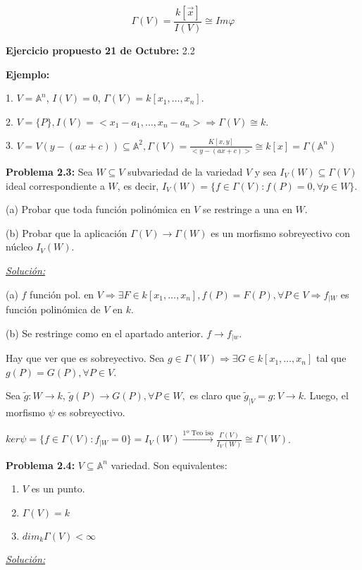 $$\Gamma(V)=\frac{k[\vec{x}]}{I(V)}\cong Im\varphi $$

\textbf{Ejercicio propuesto 21 de Octubre:} 2.2


\textbf{Ejemplo: } 

1. $V=\mathbb{A}^n $, $I(V)=0 $, $\Gamma(V)=k[x_1,\dots,x_n]$.

2. $V=\{P\}, I(V)=<x_1-a_1,\dots,x_n-a_n> \Rightarrow \Gamma (V)\cong k$.

3. $V=V(y-(ax+c))\subseteq \mathbb{A}^2, \Gamma (V)=\frac{K[x,y]}{<y-(ax+c)>}\cong k[x]=\Gamma(\mathbb{A}^n)$

\textbf{Problema 2.3: } Sea $W\subseteq V$ subvariedad de la variedad $V$ y sea $I_V(W)\subseteq \Gamma(V)$ ideal correspondiente a $W$, es decir, $I_V(W)=\{f\in \Gamma(V): f(P)=0, \forall p\in W \}$.

(a) Probar que toda función polinómica en $V$ se restringe a una en $W$.

(b) Probar que la aplicación $\Gamma(V)\rightarrow \Gamma (W)$ es un morfismo sobreyectivo con núcleo $I_V(W)$. 

\underline{\textit{Solución: }}

(a) $f$ función pol. en $V \Rightarrow \exists F\in k[x_1,\dots,x_n], f(P)=F(P), \forall P\in V \Rightarrow f_{|W}$ es función polinómica de $V$ en $k$.

(b) Se restringe como en el apartado anterior. $f\rightarrow f_{|w}$.

Hay que ver que es sobreyectivo. Sea $g\in \Gamma(W)\Rightarrow \exists G\in k[x_1,\dots,x_n]$ tal que $g(P)=G(P), \forall P\in V$.

Sea $\tilde{g}:W\rightarrow k$, $\tilde{g}(P)\rightarrow G(P), \forall P\in W,$ es claro que $\tilde{g}_{|V}=g:V\rightarrow k$. Luego, el morfismo $\psi$ es sobreyectivo.

$ker\psi = \{f\in \Gamma(V): f_{|W}=0\}=I_V(W)\xrightarrow{\text{1º Teo iso}} \frac{\Gamma(V)}{I_V(W)}\cong \Gamma(W)$.

\textbf{Problema 2.4: } $V\subseteq \mathbb{A}^n$ variedad. Son equivalentes:
\begin{enumerate}
\item $V$ es un punto.
\item $\Gamma(V)=k$
\item $dim_k\Gamma(V) <\infty$
\end{enumerate}

\underline{\textit{Solución: }}
\vspace{1mm}


